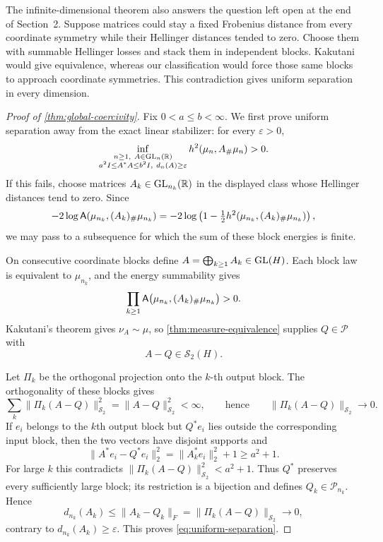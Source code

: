 The infinite-dimensional theorem also answers the question left open at the
end of Section~2. Suppose matrices could stay a fixed Frobenius distance
from every coordinate symmetry while their Hellinger distances tended to
zero. Choose them with summable Hellinger losses and stack them in
independent blocks. Kakutani would give equivalence, whereas our
classification would force those same blocks to approach coordinate
symmetries. This contradiction gives uniform separation in every dimension.

\begin{proof}[Proof of \cref{thm:global-coercivity}]
Fix \(0<a\le b<\infty\).  We first prove uniform separation away from
the exact linear stabilizer: for every \(\varepsilon>0\),
\begin{equation}
 \inf_{\substack{n\ge1,\ A\in\operatorname{GL}_n(\mathbb R)\\
                 a^2I\le A^*A\le b^2I,\ d_n(A)\ge\varepsilon}}
 h^2(\mu_n,A_\#\mu_n)>0.
 \label{eq:uniform-separation}
\end{equation}
If this fails, choose matrices \(A_k\in\operatorname{GL}_{n_k}(\mathbb R)\) in the displayed class
whose Hellinger distances tend to zero.  Since
\[
 -2\log\mathsf A(\mu_{n_k},(A_k)_\#\mu_{n_k})
 =-2\log\left(1-\tfrac12
 h^2(\mu_{n_k},(A_k)_\#\mu_{n_k})\right),
 \]
we may pass to a subsequence for which the sum of these block energies is
finite.

On consecutive coordinate blocks define
$A=\bigoplus_{k\ge1}A_k\in\operatorname{GL}(H)$.  Each block law is equivalent to
$\mu_{n_k}$, and the energy summability gives
\[
 \prod_{k\ge1}\mathsf A\bigl(\mu_{n_k},(A_k)_\#\mu_{n_k}\bigr)>0.
\]
Kakutani's theorem \cite{kakutani1948equivalence} gives \(\nu_A\sim\mu\),
so \cref{thm:measure-equivalence} supplies \(Q\in\mathcal P\) with
\begin{equation}
 A-Q\in\mathcal S_2(H).
\end{equation}

Let \(\Pi_k\) be the orthogonal projection onto the \(k\)-th output block.
The orthogonality of these blocks gives
\[
 \sum_k\|\Pi_k(A-Q)\|_{\mathcal S_2}^2=\|A-Q\|_{\mathcal S_2}^2<\infty,
 \qquad\text{hence}\qquad
 \|\Pi_k(A-Q)\|_{\mathcal S_2}\longrightarrow0.
 \]
If $e_i$ belongs to the $k$th output block but $Q^*e_i$ lies outside the
corresponding input block, then the two vectors have disjoint supports and
\begin{equation}
 \|A^*e_i-Q^*e_i\|_2^2
 =\|A_k^*e_i\|_2^2+1\ge a^2+1.
 \end{equation}
For large $k$ this contradicts
$\|\Pi_k(A-Q)\|_{\mathcal S_2}^2<a^2+1$.  Thus $Q^*$ preserves every sufficiently
large block; its restriction is a bijection and defines
$Q_k\in\mathcal P_{n_k}$.  Hence
\[
 d_{n_k}(A_k)
 \le\|A_k-Q_k\|_F
 =\|\Pi_k(A-Q)\|_{\mathcal S_2}\longrightarrow0,
\]
contrary to $d_{n_k}(A_k)\ge\varepsilon$.  This proves
\eqref{eq:uniform-separation}.


\end{proof}
